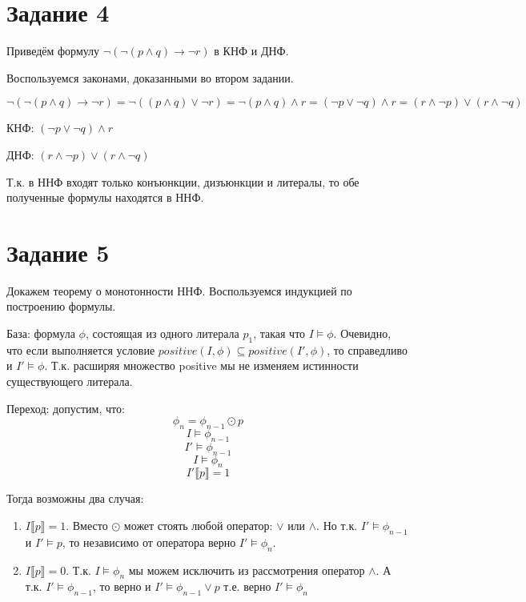 \documentclass{article}
\begin{document}
\section*{Задание 4}
Приведём формулу \(\neg(\neg(p \land q) \rightarrow \neg r)\) в КНФ и ДНФ.

Воспользуемся законами, доказанными во втором задании.

\[
    \neg(\neg(p \land q) \rightarrow \neg r) 
    = \neg((p \land q) \lor \neg r)
    = \neg (p \land q) \land r
    = (\neg p \lor \neg q) \land r 
    = (r \land \neg p) \lor (r \land \neg q)
\]

КНФ: \((\neg p \lor \neg q) \land r\)

ДНФ: \((r \land \neg p) \lor (r \land \neg q)\)

Т.к. в ННФ входят только конъюнкции, дизъюнкции и литералы, то обе полученные формулы находятся в ННФ.

\section*{Задание 5}
Докажем теорему о монотонности ННФ.
Воспользуемся индукцией по построению формулы.

База: формула \(\phi\), состоящая из одного литерала \(p_1\), такая что
\(I \models \phi\). Очевидно, что если выполняется условие 
\(positive(I, \phi) \subseteq positive(I', \phi)\), то справедливо и \(I' \models \phi\).
Т.к. расширяя множество positive мы не изменяем истинности существующего литерала.

Переход: допустим, что: 
\[\phi_n = \phi_{n-1} \odot p\] 
\[I \models \phi_{n-1}\]
\[I' \models \phi_{n-1}\]
\[I \models \phi_{n}\]
\[I' \llbracket p \rrbracket = 1 \]

Тогда возможны два случая:
\begin{enumerate}
    \item \(I \llbracket p \rrbracket = 1 \). 
    Вместо \(\odot\) может стоять любой оператор: \(\lor\) или \(\land\).
    Но т.к. \(I' \models \phi_{n-1}\) и \(I' \models p\), то независимо от оператора
    верно \(I' \models \phi_{n}\).

    \item \(I \llbracket p \rrbracket = 0 \). 
    Т.к. \(I \models \phi_n\) мы можем исключить из рассмотрения оператор \(\land\).
    А т.к. \(I' \models \phi_{n-1}\), то верно и 
    \(I' \models \phi_{n-1} \lor p\) т.е. верно 
    \(I' \models \phi_{n}\)
\end{enumerate}
\end{document}
